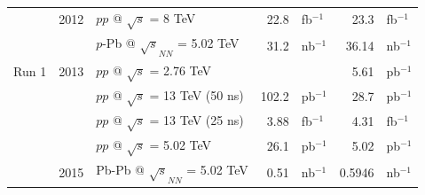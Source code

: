 \documentclass[encoding=utf8,british]{tumphthesis}
\begin{document}
\begin{table}[H]
\begin{tabular}{|c|r|l|rl|rl|}
                                                 & 2012                                           & $pp$ @ $\sqrt{s}$ = 8 TeV                                          & 22.8                         & fb$^{-1}$                             & 23.3                                         & fb$^{-1}$                             \\
                                                 & \cellcolor[HTML]{CFE2F3}                       & \cellcolor[HTML]{CFE2F3}$p$-Pb @ $\sqrt{s}_{NN}$ = 5.02 TeV     & \cellcolor[HTML]{CFE2F3}31.2 & \cellcolor[HTML]{CFE2F3}nb$^{-1}$     & \cellcolor[HTML]{CFE2F3}36.14                & \cellcolor[HTML]{CFE2F3}nb$^{-1}$      \\
\multirow{-7}{*}{Run 1}                          & \multirow{-2}{*}{\cellcolor[HTML]{CFE2F3}2013} & $pp$ @ $\sqrt{s}$ = 2.76 TeV                                       & \multicolumn{1}{l}{}         &                                       & 5.61                                         & pb$^{-1}$                             \\ \hline
\rowcolor[HTML]{CFE2F3} 
\cellcolor[HTML]{CFE2F3}                         & \cellcolor[HTML]{FFFFFF}                       & $pp$ @ $\sqrt{s}$ = 13 TeV (50 ns)                                 & 102.2                        & pb$^{-1}$                             & 28.7                                         & pb$^{-1}$                             \\
\cellcolor[HTML]{CFE2F3}                         & \cellcolor[HTML]{FFFFFF}                       & $pp$ @ $\sqrt{s}$ = 13 TeV (25 ns)                                 & 3.88                         & fb$^{-1}$                             & 4.31                                         & fb$^{-1}$                             \\
\rowcolor[HTML]{CFE2F3} 
\cellcolor[HTML]{CFE2F3}                         & \cellcolor[HTML]{FFFFFF}                       & $pp$ @ $\sqrt{s}$ = 5.02 TeV                                       & 26.1                         & pb$^{-1}$                             & 5.02                                         & pb$^{-1}$                             \\ 
\cellcolor[HTML]{CFE2F3}                         & \multirow{-4}{*}{\cellcolor[HTML]{FFFFFF}2015} & Pb-Pb @ $\sqrt{s}_{NN}$ = 5.02 TeV                                 & 0.51                         & nb$^{-1}$                             & 0.5946                                       & nb$^{-1}$                       \\

\end{tabular}
\end{table}
\end{document}
